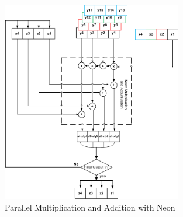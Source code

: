 \begin{figure}[h]
\centering 
\includegraphics[width= 0.7\textwidth]{images/MandA}
\caption{Parallel Multiplication and Addition with Neon  }
\label{fig:neon_mult_add}
\end{figure}
